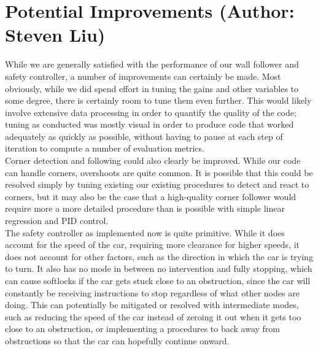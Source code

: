 \documentclass{article}
\begin{document}
\section{Potential Improvements (Author: Steven Liu)}

While we are generally satisfied with the performance of our wall follower and safety controller, a number of improvements can certainly be made. Most obviously, while we did spend effort in tuning the gains and other variables to some degree, there is certainly room to tune them even further. This would likely involve extensive data processing in order to quantify the quality of the code; tuning as conducted was mostly visual in order to produce code that worked adequately as quickly as possible, without having to pause at each step of iteration to compute a number of evaluation metrics. \\

Corner detection and following could also clearly be improved. While our code can handle corners, overshoots are quite common. It is possible that this could be resolved simply by tuning existing our existing procedures to detect and react to corners, but it may also be the case that a high-quality corner follower would require more a more detailed procedure than is possible with simple linear regression and PID control. \\

The safety controller as implemented now is quite primitive. While it does account for the speed of the car, requiring more clearance for higher speeds, it does not account for other factors, such as the direction in which the car is trying to turn. It also has no mode in between no intervention and fully stopping, which can cause softlocks if the car gets stuck close to an obstruction, since the car will constantly be receiving instructions to stop regardless of what other nodes are doing. This can potentially be mitigated or resolved with intermediate modes, such as reducing the speed of the car instead of zeroing it out when it gets too close to an obstruction, or implementing a procedures to back away from obstructions so that the car can hopefully continue onward.
\end{document}
